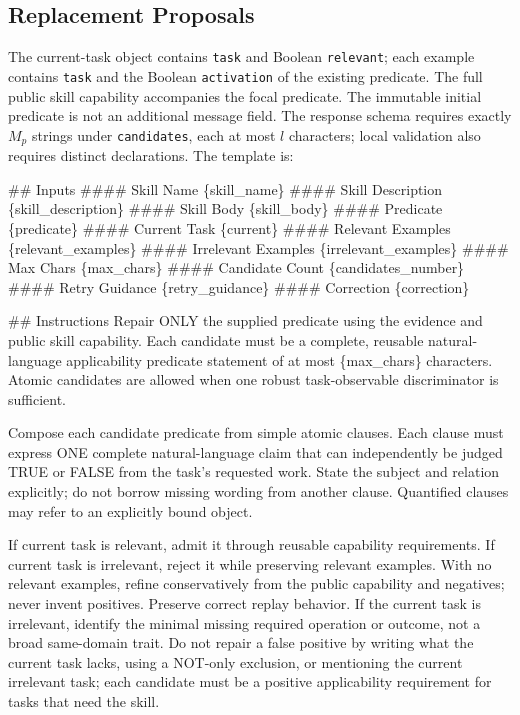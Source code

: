 \subsection{Replacement Proposals}
\label{app:prompt-proposal}
The current-task object contains \texttt{task} and Boolean \texttt{relevant}; each example contains \texttt{task} and the Boolean \texttt{activation} of the existing predicate. The full public skill capability accompanies the focal predicate. The immutable initial predicate is not an additional message field. The response schema requires exactly $M_p$ strings under \texttt{candidates}, each at most $l$ characters; local validation also requires distinct declarations. The template is:

\begingroup
\small\ttfamily\raggedright
\#\# Inputs \#\#\#\# Skill Name \{skill\_name\} \#\#\#\# Skill Description \{skill\_description\} \#\#\#\# Skill Body \{skill\_body\} \#\#\#\# Predicate \{predicate\} \#\#\#\# Current Task \{current\} \#\#\#\# Relevant Examples \{relevant\_examples\} \#\#\#\# Irrelevant Examples \{irrelevant\_examples\} \#\#\#\# Max Chars \{max\_chars\} \#\#\#\# Candidate Count \{candidates\_number\} \#\#\#\# Retry Guidance \{retry\_guidance\} \#\#\#\# Correction \{correction\}
\par\smallskip
\#\# Instructions Repair ONLY the supplied predicate using the evidence and public skill capability. Each candidate must be a complete, reusable natural-language applicability predicate statement of at most \{max\_chars\} characters. Atomic candidates are allowed when one robust task-observable discriminator is sufficient.
\par\smallskip
Compose each candidate predicate from simple atomic clauses. Each clause must express ONE complete natural-language claim that can independently be judged TRUE or FALSE from the task's requested work. State the subject and relation explicitly; do not borrow missing wording from another clause. Quantified clauses may refer to an explicitly bound object.
\par\smallskip
If current task is relevant, admit it through reusable capability requirements. If current task is irrelevant, reject it while preserving relevant examples. With no relevant examples, refine conservatively from the public capability and negatives; never invent positives. Preserve correct replay behavior. If the current task is irrelevant, identify the minimal missing required operation or outcome, not a broad same-domain trait. Do not repair a false positive by writing what the current task lacks, using a NOT-only exclusion, or mentioning the current irrelevant task; each candidate must be a positive applicability requirement for tasks that need the skill.
